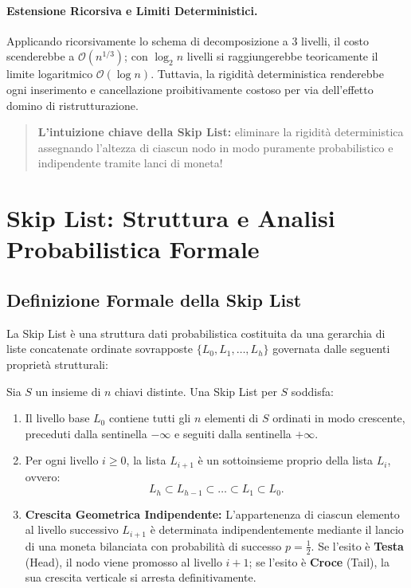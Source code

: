 \paragraph{Estensione Ricorsiva e Limiti Deterministici.}
Applicando ricorsivamente lo schema di decomposizione a $3$ livelli, il costo scenderebbe a $\mathcal{O}(n^{1/3})$; con $\log_2 n$ livelli si raggiungerebbe teoricamente il limite logaritmico $\mathcal{O}(\log n)$. Tuttavia, la rigidità deterministica renderebbe ogni inserimento e cancellazione proibitivamente costoso per via dell'effetto domino di ristrutturazione.

\begin{quote}
  \textbf{L'intuizione chiave della Skip List:} eliminare la rigidità deterministica assegnando l'altezza di ciascun nodo in modo puramente probabilistico e indipendente tramite lanci di moneta!
\end{quote}

\FloatBarrier
\section{Skip List: Struttura e Analisi Probabilistica Formale}
\label{sec:skip-list-probabilistic-analysis}

\subsection{Definizione Formale della Skip List}
La Skip List è una struttura dati probabilistica costituita da una gerarchia di liste concatenate ordinate sovrapposte $\{L_0, L_1, \dots, L_h\}$ governata dalle seguenti proprietà strutturali:

\begin{definition}
Sia $S$ un insieme di $n$ chiavi distinte. Una Skip List per $S$ soddisfa:
\begin{enumerate}
  \item Il livello base $L_0$ contiene tutti gli $n$ elementi di $S$ ordinati in modo crescente, preceduti dalla sentinella $-\infty$ e seguiti dalla sentinella $+\infty$.
  \item Per ogni livello $i \ge 0$, la lista $L_{i+1}$ è un sottoinsieme proprio della lista $L_i$, ovvero:
  \begin{equation}
    L_h \subset L_{h-1} \subset \dots \subset L_1 \subset L_0.
  \end{equation}
  \item \textbf{Crescita Geometrica Indipendente:} L'appartenenza di ciascun elemento al livello successivo $L_{i+1}$ è determinata indipendentemente mediante il lancio di una moneta bilanciata con probabilità di successo $p = \frac{1}{2}$. Se l'esito è \textbf{Testa} (Head), il nodo viene promosso al livello $i+1$; se l'esito è \textbf{Croce} (Tail), la sua crescita verticale si arresta definitivamente.
\end{enumerate}
\end{definition}

